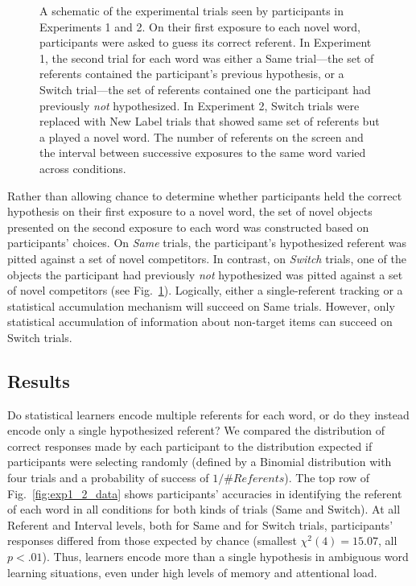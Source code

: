 \documentclass{pnastwo}
\begin{document}
\begin{article}
\begin{figure}[b]
	\caption{\label{fig:design} A schematic of the experimental trials seen by participants in Experiments 1 and 2. On their first exposure to each novel word, participants were asked to guess its correct referent. In Experiment 1, the second trial for each word was either a Same trial---the set of referents contained the participant's previous hypothesis, or a Switch trial---the set of referents contained one the participant had previously \emph{not} hypothesized. In Experiment 2, Switch trials were replaced with New Label trials that showed same set of referents but a played a novel word. The number of referents on the screen and the interval between successive exposures to the same word varied across conditions.}
\end{figure}

Rather than allowing chance to determine whether participants held the correct hypothesis on their first exposure to a novel word, the set of novel objects presented on the second exposure to each word was constructed based on participants' choices. On \emph{Same} trials, the participant's hypothesized referent was pitted against a set of novel competitors. In contrast, on \emph{Switch} trials, one of the objects the participant had previously \emph{not} hypothesized was pitted against a set of novel competitors (see Fig.~\ref{fig:design}). Logically, either a single-referent tracking or a statistical accumulation mechanism will succeed on Same trials. However, only statistical accumulation of information about non-target items can  succeed on Switch trials.

\subsection{Results}

Do statistical learners encode multiple referents for each word, or do they instead encode only a single hypothesized referent? We compared the distribution of correct responses made by each participant to the distribution expected if participants were selecting randomly (defined by a Binomial distribution with four trials and a probability of success of  $1/\#Referents$). The top row of Fig.~\ref{fig:exp1_2_data} shows participants' accuracies in identifying the referent of each word in all conditions for both kinds of trials (Same and Switch). At all Referent and Interval levels, both for Same and for Switch trials, participants' responses differed from those expected by chance (smallest $\chi^{2}(4) = 15.07$, all $p < .01$). Thus, learners encode more than a single hypothesis in ambiguous word learning situations, even under high levels of memory and attentional load. 


\end{article}
\end{document}
